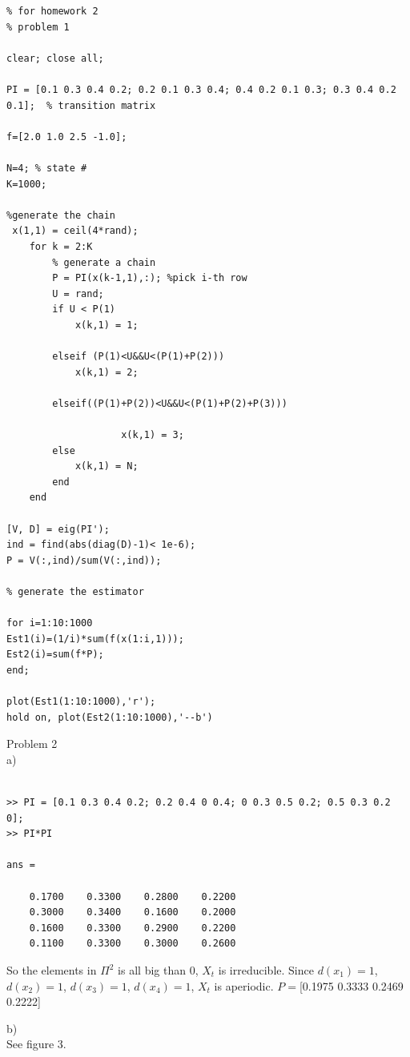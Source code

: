 \documentclass[12pt] {article}
\begin{document}
\begin{lstlisting}
% for homework 2
% problem 1

clear; close all;

PI = [0.1 0.3 0.4 0.2; 0.2 0.1 0.3 0.4; 0.4 0.2 0.1 0.3; 0.3 0.4 0.2 0.1];  % transition matrix

f=[2.0 1.0 2.5 -1.0];

N=4; % state #
K=1000;

%generate the chain
 x(1,1) = ceil(4*rand);
    for k = 2:K
        % generate a chain
        P = PI(x(k-1,1),:); %pick i-th row
        U = rand;
        if U < P(1)
            x(k,1) = 1;
            
        elseif (P(1)<U&&U<(P(1)+P(2)))
            x(k,1) = 2;
            
        elseif((P(1)+P(2))<U&&U<(P(1)+P(2)+P(3)))
                    
                    x(k,1) = 3;
        else
            x(k,1) = N; 
        end
    end
 
[V, D] = eig(PI'); 
ind = find(abs(diag(D)-1)< 1e-6);
P = V(:,ind)/sum(V(:,ind));
    
% generate the estimator

for i=1:10:1000
Est1(i)=(1/i)*sum(f(x(1:i,1)));
Est2(i)=sum(f*P);
end;

plot(Est1(1:10:1000),'r');
hold on, plot(Est2(1:10:1000),'--b')
\end{lstlisting}


Problem 2 \\
a) \\
\begin{lstlisting}

>> PI = [0.1 0.3 0.4 0.2; 0.2 0.4 0 0.4; 0 0.3 0.5 0.2; 0.5 0.3 0.2 0]; 
>> PI*PI

ans =

    0.1700    0.3300    0.2800    0.2200
    0.3000    0.3400    0.1600    0.2000
    0.1600    0.3300    0.2900    0.2200
    0.1100    0.3300    0.3000    0.2600
\end{lstlisting}

So the elements in $\Pi^2$ is all big than 0, $X_t$ is irreducible.  Since $d(x_1)=1$, $d(x_2)=1$, $d(x_3)=1$, $d(x_4)=1$, $X_t$ is aperiodic. 
$P =$[0.1975    0.3333    0.2469    0.2222]

b) \\ 
See figure 3.
\end{document}
